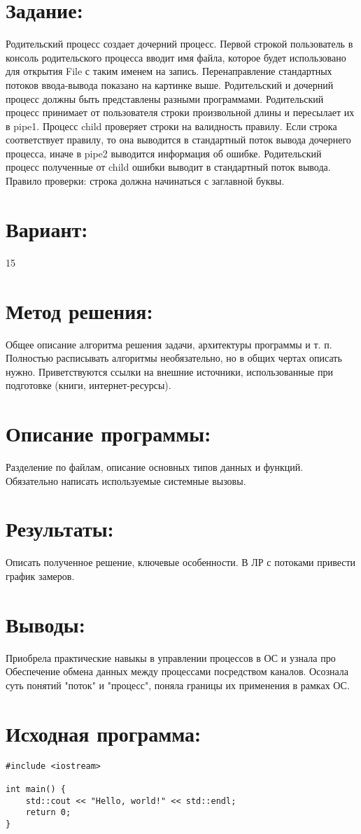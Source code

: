 \documentclass[14pt,a4paper]{extarticle}
\begin{document}
\section*{Задание:}
Родительский процесс создает дочерний процесс. Первой строкой пользователь в консоль родительского процесса вводит имя файла, которое будет использовано для открытия File с таким именем на запись. Перенаправление стандартных потоков ввода-вывода показано на картинке выше. Родительский и дочерний процесс должны быть представлены разными программами. Родительский процесс принимает от пользователя строки произвольной длины и пересылает их в pipe1. Процесс child проверяет строки на валидность правилу. Если строка соответствует правилу, то она выводится в стандартный поток вывода дочернего процесса, иначе в pipe2 выводится информация об ошибке. Родительский процесс полученные от child ошибки выводит в стандартный поток вывода. Правило проверки: строка должна начинаться с заглавной буквы.
\section*{Вариант:}
15

\section*{Метод решения:}
Общее описание алгоритма решения задачи, архитектуры программы и т. п. Полностью расписывать алгоритмы необязательно, но в общих чертах описать нужно. Приветствуются ссылки на внешние источники, использованные при подготовке (книги, интернет-ресурсы).

\section*{Описание программы:}
Разделение по файлам, описание основных типов данных и функций. Обязательно написать используемые системные вызовы.

\section*{Результаты:}
Описать полученное решение, ключевые особенности. В ЛР с потоками привести график замеров.

\section*{Выводы:}
Приобрела практические навыкы в управлении процессов в ОС и узнала про Обеспечение обмена данных между процессами посредством каналов. Осознала суть понятий "поток" и "процесс", поняла границы их применения в рамках ОС. 
\newpage
\section*{Исходная программа:}

\begin{verbatim}
#include <iostream>

int main() {
    std::cout << "Hello, world!" << std::endl;
    return 0;
}
\end{verbatim}
\end{document}
